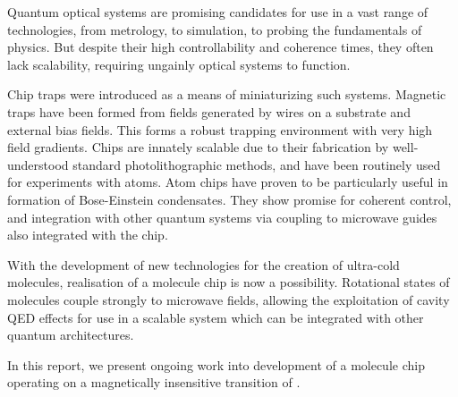 Quantum optical systems are promising candidates for use in a vast range of
technologies, from metrology, to simulation, to probing the fundamentals of
physics. But despite their high controllability and coherence times, they often
lack scalability, requiring ungainly optical systems to function.

Chip traps were introduced as a means of miniaturizing such systems. Magnetic
traps have been formed from fields generated by wires on a substrate and
external bias fields. This forms a robust trapping environment with very high
field gradients. Chips are innately scalable due to their fabrication by
well-understood standard photolithographic methods, and have been routinely used
for experiments with atoms. Atom chips have proven to be particularly useful in
formation of Bose-Einstein condensates. They show promise for coherent control,
and integration with other quantum systems via coupling to microwave guides also
integrated with the chip.

With the development of new technologies for the creation of ultra-cold
molecules, realisation of a molecule chip is now a possibility. Rotational
states of molecules couple strongly to microwave fields, allowing the
exploitation of cavity QED effects for use in a scalable system which can be
integrated with other quantum architectures.

In this report, we present ongoing work into development of a molecule chip
operating on a magnetically insensitive transition of \CaF{}.
